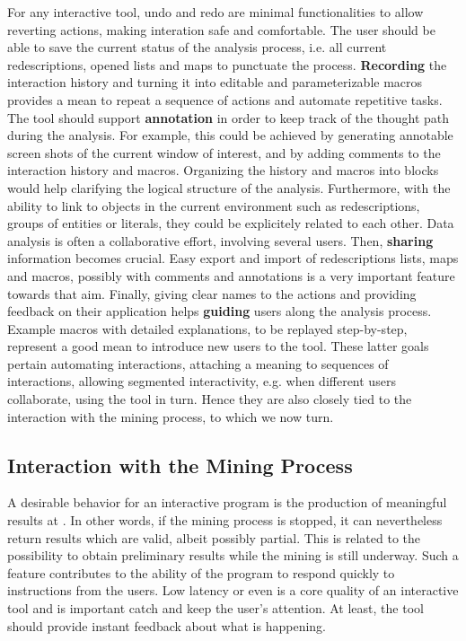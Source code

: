 For any interactive tool, undo and redo are minimal functionalities to
allow reverting actions, making interation safe and comfortable.  The
user should be able to save the current status of the analysis
process, i.e. all current redescriptions, opened lists and maps to
punctuate the process. \textbf{Recording} the interaction history and
turning it into editable and parameterizable macros provides a mean to
repeat a sequence of actions and automate repetitive tasks.  The tool
should support \textbf{annotation} in order to keep track of the
thought path during the analysis.  For example, this could be achieved
by generating annotable screen shots of the current window of
interest, and by adding comments to the interaction history and
macros.  Organizing the history and macros into blocks would help
clarifying the logical structure of the analysis.  Furthermore, with
the ability to link to objects in the current environment such as
redescriptions, groups of entities or literals, they could be
explicitely related to each other.  Data analysis is often a
collaborative effort, involving several users. Then, \textbf{sharing}
information becomes crucial.  Easy export and import of redescriptions
lists, maps and macros, possibly with comments and annotations is a
very important feature towards that aim.  Finally, giving clear names
to the actions and providing feedback on their application helps
\textbf{guiding} users along the analysis process. Example macros with
detailed explanations, to be replayed step-by-step, represent a good
mean to introduce new users to the tool.  These latter goals pertain
automating interactions, attaching a meaning to sequences of
interactions, allowing segmented interactivity, e.g. when different
users collaborate, using the tool in turn. Hence they are also closely
tied to the interaction with the mining process, to which we now turn.

\subsection{Interaction with the Mining Process}
\label{sec:goals-interaction}

A desirable behavior for an interactive program is the production of
meaningful results at .  In other words, if the
mining process is stopped, it can nevertheless return results which
are valid, albeit possibly partial.  This is related to the possibility
to obtain preliminary results while the mining is still underway.  Such a
feature contributes to the ability of the program to respond quickly
to instructions from the users. Low latency or even  is a core
quality of an interactive tool and is important catch and keep the
user's attention. At least, the tool should provide instant feedback
about what is happening.

